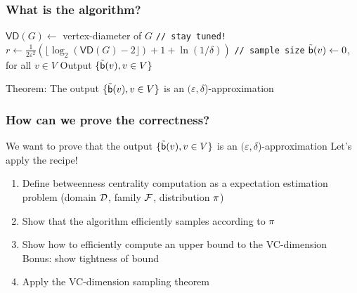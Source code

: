 \begin{frame}
  \frametitle{What is the algorithm?}
  \begin{algorithm}[H]
    \DontPrintSemicolon
    $\mathsf{VD}(G)\leftarrow$ vertex-diameter of $G$ \texttt{// stay
    tuned!}\;
    $r\leftarrow\frac{1}{2\varepsilon^2}\left(\lfloor\log_2(\mathsf{VD}(G)-2\rfloor)
    +1 + \ln(1/\delta)\right)$ \texttt{// sample size}\;
    $\tilde{\mathsf{b}}(v)\leftarrow 0$, for all $v\in V$\;
    Output $\{\tilde{\mathsf{b}}(v), v\in V\}$
  \end{algorithm}
  Theorem: The output $\{\tilde{\mathsf{b}}(v), v\in V\}$ is an
  $(\varepsilon,\delta$)-approximation
\end{frame}

\begin{frame}
  \frametitle{How can we prove the correctness?}
  We want to prove that the output $\{\tilde{\mathsf{b}}(v), v\in V\}$ is an
  $(\varepsilon,\delta$)-approximation
  \vfill
  Let's apply the recipe!

  \begin{enumerate}
    \item  Define betweenness centrality computation as a expectation
      estimation problem (domain ${\cal D}$, family ${\cal F}$, distribution
      $\pi$)
    \item Show that the algorithm efficiently samples according to $\pi$
    \item Show how to efficiently compute an upper bound to the VC-dimension\\
      \quad Bonus: show tightness of bound
    \item Apply the VC-dimension sampling theorem
  \end{enumerate}
\end{frame}

